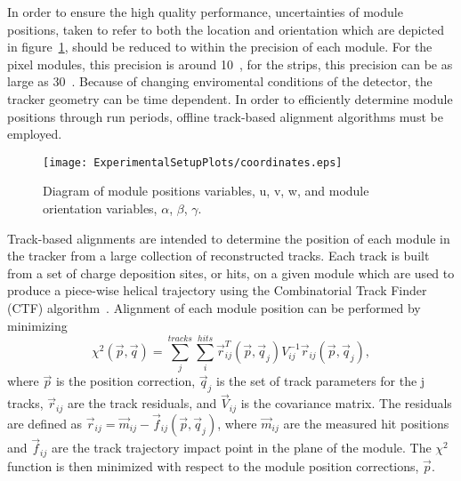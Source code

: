 In order to ensure the high quality performance, uncertainties of module 
positions, taken to refer to both the location and orientation which are
depicted in figure~\ref{fig:ModuleCoordinates},
should be reduced to within the precision of each module.  For the
pixel modules, this precision is around 10~\microns, for the strips, this 
precision can be as large as 30~\microns.  Because of changing enviromental
conditions of the detector, the tracker geometry can be time dependent. 
In order to efficiently determine module positions through run periods, 
offline track-based alignment algorithms must be employed.  

\begin{figure}
\begin{center}
\texttt{[image: ExperimentalSetupPlots/coordinates.eps]}
\caption{Diagram of module positions variables, u, v, w, and module orientation
variables, $\alpha$, $\beta$, $\gamma$.}
\label{fig:ModuleCoordinates}
\end{center}
\end{figure}

Track-based alignments are intended to determine the position of each module
in the tracker from a large collection of reconstructed tracks.  Each track
is built from a set of charge deposition sites, or hits, on a given module
which are used to produce a piece-wise helical trajectory using the
Combinatorial Track Finder (CTF) algorithm~\cite{Borrello:2010zz}.  
Alignment of each module position can be performed by minimizing
\begin{equation}
\chi^2(\vec{p},\vec{q}) = \sum_{j}^{tracks}\sum_{i}^{hits}\vec{r}_{ij}^{T}(\vec{p},\vec{q}_j)V^{-1}_{ij}\vec{r}_{ij}(\vec{p},\vec{q}_j),
\end{equation}
where $\vec{p}$ is the position correction, $\vec{q}_j$ is the set of 
track parameters for the j tracks, $\vec{r}_{ij}$ are the track 
residuals, and $\vec{V}_{ij}$ is the covariance matrix.  The residuals are
defined as $\vec{r}_{ij} = \vec{m}_{ij} - \vec{f}_{ij}(\vec{p},\vec{q}_j)$, 
where $\vec{m}_{ij}$ are the measured hit positions and $\vec{f}_{ij}$ are
the track trajectory impact point in the plane of the module.  The 
$\chi^2$ function is then minimized with respect to the module position 
corrections, $\vec{p}$.

